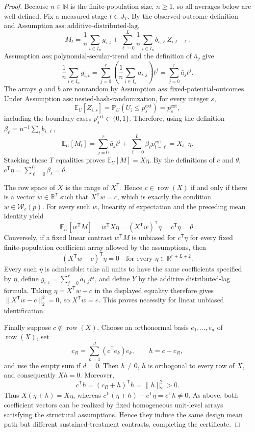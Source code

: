 \documentclass{article}
\begin{document}
\begin{proof}
Because \(n\in\mathbb N\) is the finite-population size, \(n\ge1\), so all averages below are well defined.  Fix a measured stage \(t\in J_T\).  By the observed-outcome definition and Assumption \(\mathrm{ass:additive\text{-}distributed\text{-}lag}\),
\[
 M_t=\frac1n\sum_{i\in I_n}g_{i,t}
     +\sum_{\ell=0}^{L}\frac1n\sum_{i\in I_n}b_{i,\ell}Z_{i,t-\ell}.
\]
Assumption \(\mathrm{ass:polynomial\text{-}secular\text{-}trend}\) and the definition of \(\bar a_j\) give
\[
 \frac1n\sum_{i\in I_n}g_{i,t}
 =\sum_{j=0}^{r}\left(\frac1n\sum_{i\in I_n}a_{i,j}\right)t^j
 =\sum_{j=0}^{r}\bar a_jt^j.
\]
The arrays \(g\) and \(b\) are nonrandom by Assumption \(\mathrm{ass:fixed\text{-}potential\text{-}outcomes}\).  Under Assumption \(\mathrm{ass:nested\text{-}hash\text{-}randomization}\), for every integer \(s\),
\[
 \mathbb E_U[Z_{i,s}]
 =\mathbb P_U(U_i\le p_s^{\mathrm{ext}})
 =p_s^{\mathrm{ext}},
\]
including the boundary cases \(p_s^{\mathrm{ext}}\in\{0,1\}\).  Therefore, using the definition \(\beta_\ell=n^{-1}\sum_i b_{i,\ell}\),
\[
 \mathbb E_U[M_t]
 =\sum_{j=0}^{r}\bar a_jt^j
   +\sum_{\ell=0}^{L}\beta_\ell p_{t-\ell}^{\mathrm{ext}}
 =X_{t,\cdot}\eta.
\]
Stacking these \(T\) equalities proves \(\mathbb E_U[M]=X\eta\).  By the definitions of \(c\) and \(\theta\), \(c^{\mathsf T}\eta=\sum_{\ell=0}^{L}\beta_\ell=\theta\).

The row space of \(X\) is the range of \(X^{\mathsf T}\).  Hence \(c\in\operatorname{row}(X)\) if and only if there is a vector \(w\in\mathbb R^T\) such that \(X^{\mathsf T}w=c\), which is exactly the condition \(w\in\mathcal W_c(p)\).  For every such \(w\), linearity of expectation and the preceding mean identity yield
\[
 \mathbb E_U[w^{\mathsf T}M]
 =w^{\mathsf T}X\eta
 =(X^{\mathsf T}w)^{\mathsf T}\eta
 =c^{\mathsf T}\eta
 =\theta.
\]
Conversely, if a fixed linear contrast \(w^{\mathsf T}M\) is unbiased for \(c^{\mathsf T}\eta\) for every fixed finite-population coefficient array allowed by the assumptions, then
\[
 (X^{\mathsf T}w-c)^{\mathsf T}\eta=0
 \quad\text{for every }\eta\in\mathbb R^{r+L+2}.
\]
Every such \(\eta\) is admissible: take all units to have the same coefficients specified by \(\eta\), define \(g_{i,t}=\sum_{j=0}^{r}a_{i,j}t^j\), and define \(Y\) by the additive distributed-lag formula.  Taking \(\eta=X^{\mathsf T}w-c\) in the displayed equality therefore gives \(\lVert X^{\mathsf T}w-c\rVert_2^2=0\), so \(X^{\mathsf T}w=c\).  This proves necessity for linear unbiased identification.

Finally suppose \(c\notin\operatorname{row}(X)\).  Choose an orthonormal basis \(e_1,\ldots,e_d\) of \(\operatorname{row}(X)\), set
\[
 c_R=\sum_{k=1}^{d}(c^{\mathsf T}e_k)e_k,
 \qquad h=c-c_R,
\]
and use the empty sum if \(d=0\).  Then \(h\ne0\), \(h\) is orthogonal to every row of \(X\), and consequently \(Xh=0\).  Moreover,
\[
 c^{\mathsf T}h=(c_R+h)^{\mathsf T}h=\lVert h\rVert_2^2>0.
\]
Thus \(X(\eta+h)=X\eta\), whereas \(c^{\mathsf T}(\eta+h)-c^{\mathsf T}\eta=c^{\mathsf T}h\ne0\).  As above, both coefficient vectors can be realized by fixed homogeneous unit-level arrays satisfying the structural assumptions.  Hence they induce the same design mean path but different sustained-treatment contrasts, completing the certificate.
\end{proof}
\end{document}
